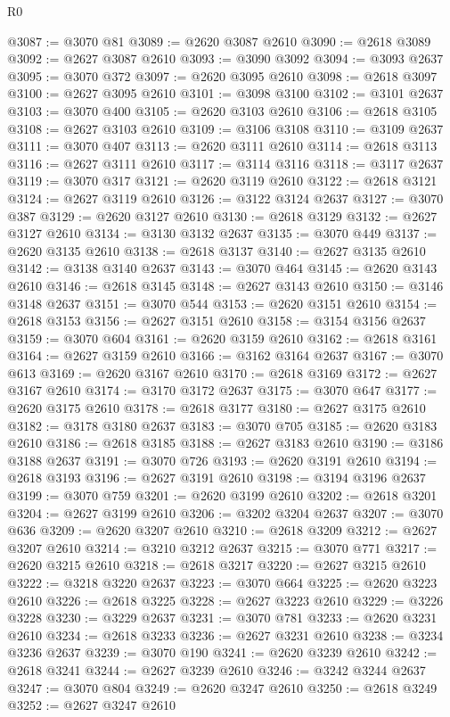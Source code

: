 \begin{lexlean}{R0}
\begin{coremodule}
@3087 := @3070 @81
@3089 := @2620 @3087 @2610
@3090 := @2618 @3089
@3092 := @2627 @3087 @2610
@3093 := @3090 @3092
@3094 := @3093 @2637
@3095 := @3070 @372
@3097 := @2620 @3095 @2610
@3098 := @2618 @3097
@3100 := @2627 @3095 @2610
@3101 := @3098 @3100
@3102 := @3101 @2637
@3103 := @3070 @400
@3105 := @2620 @3103 @2610
@3106 := @2618 @3105
@3108 := @2627 @3103 @2610
@3109 := @3106 @3108
@3110 := @3109 @2637
@3111 := @3070 @407
@3113 := @2620 @3111 @2610
@3114 := @2618 @3113
@3116 := @2627 @3111 @2610
@3117 := @3114 @3116
@3118 := @3117 @2637
@3119 := @3070 @317
@3121 := @2620 @3119 @2610
@3122 := @2618 @3121
@3124 := @2627 @3119 @2610
@3126 := @3122 @3124 @2637
@3127 := @3070 @387
@3129 := @2620 @3127 @2610
@3130 := @2618 @3129
@3132 := @2627 @3127 @2610
@3134 := @3130 @3132 @2637
@3135 := @3070 @449
@3137 := @2620 @3135 @2610
@3138 := @2618 @3137
@3140 := @2627 @3135 @2610
@3142 := @3138 @3140 @2637
@3143 := @3070 @464
@3145 := @2620 @3143 @2610
@3146 := @2618 @3145
@3148 := @2627 @3143 @2610
@3150 := @3146 @3148 @2637
@3151 := @3070 @544
@3153 := @2620 @3151 @2610
@3154 := @2618 @3153
@3156 := @2627 @3151 @2610
@3158 := @3154 @3156 @2637
@3159 := @3070 @604
@3161 := @2620 @3159 @2610
@3162 := @2618 @3161
@3164 := @2627 @3159 @2610
@3166 := @3162 @3164 @2637
@3167 := @3070 @613
@3169 := @2620 @3167 @2610
@3170 := @2618 @3169
@3172 := @2627 @3167 @2610
@3174 := @3170 @3172 @2637
@3175 := @3070 @647
@3177 := @2620 @3175 @2610
@3178 := @2618 @3177
@3180 := @2627 @3175 @2610
@3182 := @3178 @3180 @2637
@3183 := @3070 @705
@3185 := @2620 @3183 @2610
@3186 := @2618 @3185
@3188 := @2627 @3183 @2610
@3190 := @3186 @3188 @2637
@3191 := @3070 @726
@3193 := @2620 @3191 @2610
@3194 := @2618 @3193
@3196 := @2627 @3191 @2610
@3198 := @3194 @3196 @2637
@3199 := @3070 @759
@3201 := @2620 @3199 @2610
@3202 := @2618 @3201
@3204 := @2627 @3199 @2610
@3206 := @3202 @3204 @2637
@3207 := @3070 @636
@3209 := @2620 @3207 @2610
@3210 := @2618 @3209
@3212 := @2627 @3207 @2610
@3214 := @3210 @3212 @2637
@3215 := @3070 @771
@3217 := @2620 @3215 @2610
@3218 := @2618 @3217
@3220 := @2627 @3215 @2610
@3222 := @3218 @3220 @2637
@3223 := @3070 @664
@3225 := @2620 @3223 @2610
@3226 := @2618 @3225
@3228 := @2627 @3223 @2610
@3229 := @3226 @3228
@3230 := @3229 @2637
@3231 := @3070 @781
@3233 := @2620 @3231 @2610
@3234 := @2618 @3233
@3236 := @2627 @3231 @2610
@3238 := @3234 @3236 @2637
@3239 := @3070 @190
@3241 := @2620 @3239 @2610
@3242 := @2618 @3241
@3244 := @2627 @3239 @2610
@3246 := @3242 @3244 @2637
@3247 := @3070 @804
@3249 := @2620 @3247 @2610
@3250 := @2618 @3249
@3252 := @2627 @3247 @2610

\end{coremodule}
\end{lexlean}
